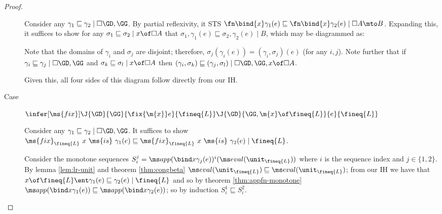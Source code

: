 \documentclass{article}
\newcommand{\ale}{\sqsubseteq}
\newcommand{\ALER}{\arrow[no line]{r}{\rotatebox[origin=c]{0}{\scalebox{1.33}{$\ale$}}}}
\newcommand{\ALED}{\arrow[no line]{d}{\rotatebox[origin=c]{-90}{\scalebox{1.33}{$\ale$}}}}
\newcommand{\tfix}[2]{\ms{fix}_{#1}~{#2}~\ms{is}~}
\newcommand{\disc}[1]{\square{#1}}
\newcommand{\lr}[2]{#2\mathrel{|}#1}
\newcommand{\lrcx}[3]{#1 \ent \lr{#2}{#3}}
\newcommand{\commsq}[5]{\lr{#1}{{#2}, {#4} \ale {#3}, {#5}}}
\begin{document}
\begin{proof}
\begin{description}
    Consider any $\lr{\cxdisc{\GD},\GG}{\gamma_1 \ale \gamma_2}$. By partial
    reflexivity, it STS $\lr{\disc{A} \mto B}{\fn\bind{x} \gamma_1(e) \ale
      \fn\bind{x} \gamma_2(e)}$. Expanding this, it suffices to show for any
    $\lr{x \of \disc{A}}{\sigma_1 \ale \sigma_2}$ that
    $\commsq{B}{\sigma_1}{\sigma_2}{\gamma_1(e)}{\gamma_2(e)}$, which may be
    diagrammed as:
    \begin{center}
              {}
    \end{center}

    Note that the domains of $\gamma_i$ and $\sigma_j$ are disjoint; therefore,
    $\sigma_j(\gamma_i(e)) = (\gamma_i,\sigma_j)(e)$ (for any $i,j$). Note
    further that if $\lr{\cxdisc{\GD},\GG}{\gamma_i \ale \gamma_j}$ and
    $\lr{x\of\disc{A}}{\sigma_k \ale \sigma_l}$ then
    $\lr{\cxdisc{\GD},\GG,x\of\disc{A}}{(\gamma_i,\sigma_k) \ale
      (\gamma_j,\sigma_l)}$.

    Given this, all four sides of this diagram follow directly from our IH.


    \vspace{1em}
  \item[Case] $\infer[\ms{fix}]{\J{\GD}{\GG}{\fix{\m{x}} e}{\fineq{L}}}{
    \J{\GD}{\GG,\m{x}\of \fineq{L}}{e}{\fineq{L}}}$

    Consider any $\lr{\cxdisc{\GD},\GG}{\gamma_1 \ale \gamma_2}$. It suffices to
    show $\lr{\fineq{L}}{\tfix{\fineq{L}}{x}{\gamma_1(e)} \ale
      \tfix{\fineq{L}}{x}{\gamma_2(e)}}$.

    Consider the monotone sequences $S^j_i =
    \nthapp{x}{\gamma_j(e)}{i}{\evalfn(\unit_{\fineq{L}})}$ where $i$ is the
    sequence index and $j \in \{1,2\}$. By lemma \ref{lem:lr-unit} and theorem
    \ref{thm:congbeta} $\evalfn(\unit_{\fineq{L}}) \ale
    \evalfn(\unit_{\fineq{L}})$; from our IH we have that
    $\lrcx{x\of\fineq{L}}{\fineq{L}}{\gamma_1(e) \ale \gamma_2(e)}$ and so by
    theorem \ref{thm:appfn-monotone} $\appfn{x}{\gamma_1(e)} \ale
    \appfn{x}{\gamma_2(e)}$; so by induction $S_i^1 \ale S_i^2$.


\end{description}
\end{proof}
\end{document}
